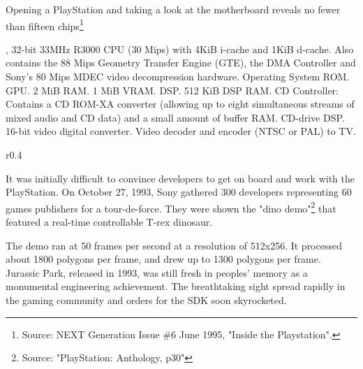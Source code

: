 \par
\vspace{15pt}
Opening a PlayStation and taking a look at the motherboard reveals no fewer than fifteen chips\footnote{Source: NEXT Generation Issue \#6 June 1995, "Inside the Playstation".}\\
\par
{}, 32-bit 33MHz R3000 CPU (30 Mips) with  4KiB i-cache and 1KiB d-cache. Also contains the 88 Mips Geometry Transfer Engine (GTE), the DMA Controller and Sony's 80 Mips MDEC video decompression hardware.
 Operating System ROM.
 GPU.
 2 MiB RAM.
 1 MiB VRAM.
 DSP.
 512 KiB DSP RAM.
 CD Controller: Contains a CD ROM-XA converter (allowing up to eight simultaneous streams of mixed audio and CD data) and a small amount of buffer RAM.
 CD-drive DSP.
 16-bit video digital converter.
 Video decoder and encoder (NTSC or PAL) to TV.


\par
\begin{wrapfigure}[10]{r}{0.4\textwidth}{
\centering {}}
\end{wrapfigure}
It was initially difficult to convince developers to get on board and work with the PlayStation. On October 27, 1993, Sony gathered 300 developers representing 60 games publishers for a tour-de-force. They were shown the "dino demo"\footnote{Source: "PlayStation: Anthology, p30"} that featured a real-time controllable T-rex dinosaur.\\
\par The demo ran at 50 frames per second at a resolution of 512x256. It processed about 1800 polygons per frame, and drew up to 1300 polygons per frame. Jurassic Park, released in 1993, was still fresh in peoples' memory as a monumental engineering achievement. The breathtaking sight spread rapidly in the gaming community and orders for the SDK soon skyrocketed.
 
 






